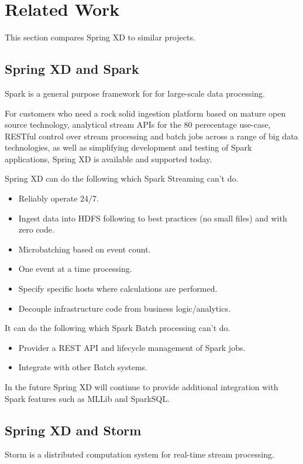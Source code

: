 \section{Related Work}
This section compares Spring XD to similar projects.

\subsection{Spring XD and Spark}
Spark is a general purpose framework for for large-scale data processing.

For customers who need a rock solid ingestion platform based on mature open source technology, analytical stream APIs for the 80 perecentage use-case, RESTful control over stream processing and batch jobs across a range of big data technologies, as well as simplifying development and testing of Spark applications, Spring XD is available and supported today.

Spring XD can do the following which Spark Streaming can't do.

\begin{itemize}
\item Reliably operate 24/7.
\item Ingest data into HDFS following to best practices (no small files) and with zero code.
\item Microbatching based on event count.
\item One event at a time processing.
\item Specify specific hosts where calculations are performed.
\item Decouple infrastructure code from business logic/analytics.
\end{itemize}

It can do the following which Spark Batch processing can't do.

\begin{itemize}
\item Provider a REST API and lifecycle management of Spark jobs.
\item Integrate with other Batch systems.
\end{itemize}

In the future Spring XD will continue to provide additional integration with Spark features such as MLLib and SparkSQL.

\subsection{Spring XD and Storm}
Storm is a distributed computation system for real-time stream processing.

